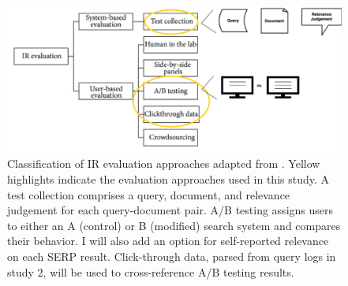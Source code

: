 \begin{figure}[H]
    \centering
    \includegraphics[width=1\textwidth]{../figures/Methods_Evaluation.png}
    \caption{Classification of IR evaluation approaches adapted from \cite{Samimi2014}. Yellow highlights indicate the evaluation approaches used in this study. A test collection comprises a query, document, and relevance judgement for each query-document pair. A/B testing assigns users to either an A (control) or B (modified) search system and compares their behavior. I will also add an option for self-reported relevance on each SERP result. Click-through data, parsed from query logs in study 2, will be used to cross-reference A/B testing results.}
    \label{fig:Methods_Evaluation}
\end{figure}